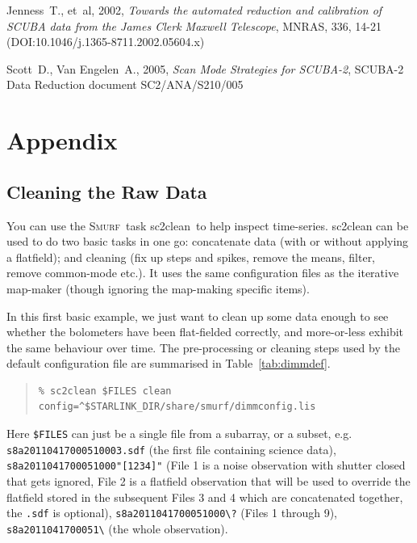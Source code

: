 \documentclass[twoside,11pt]{article}
\newcommand{\htmladdnormallink}[2]{#1}
\newcommand{\htmlref}[2]{#1}
\newcommand{\latexhtml}[2]{#1}
\newcommand{\xref}[3]{#1}
\newcommand{\xlabel}[1]{}
\renewcommand{\_}{\texttt{\symbol{95}}}
\newenvironment{myquote}{\begin{quote}\begin{small}}{\end{small}\end{quote}}
\newcommand{\smurf}{\xref{\textsc{Smurf}}{sun258}{}}
\newcommand{\task}[1]{\textsf{#1}}
\newcommand{\clean}{\xref{\task{sc2clean}}{sun258}{SC2CLEAN}}
\newcommand{\cref}[3]{\latexhtml{#1~\ref{#2}}{\htmlref{#3}{#2}}}
\begin{document}
\begin{thebibliography}{}
Jenness~T., et~al, 2002, \htmladdnormallink{\textit{Towards the automated
reduction and calibration of SCUBA data from the James Clerk Maxwell
Telescope}}{http://dx.doi.org/10.1046/j.1365-8711.2002.05604.x},
MNRAS, 336, 14-21 (DOI:10.1046/j.1365-8711.2002.05604.x)

Scott~D., Van Engelen~A., 2005, \htmladdnormallink{\textit{Scan Mode Strategies for
SCUBA-2}}{http://docs.jach.hawaii.edu/JCMT/SC2/ANA/S210/005/sc2_ana_s210_005.ps},
SCUBA-2 Data Reduction document SC2/ANA/S210/005

\end{thebibliography}

\newpage
\appendix
\section[Appendices]{Appendix}
\subsection{\xlabel{app_clean}Cleaning the Raw Data}
\label{app:clean}

You can use the \smurf\ task \clean\ to help inspect time-series.
\task{sc2clean} can be used to do two basic tasks in one go: concatenate data
(with or without applying a flatfield); and cleaning (fix up steps and
spikes, remove the means, filter, remove common-mode etc.). It uses
the same configuration files as the iterative map-maker (though
ignoring the map-making specific items).

In this first basic example, we just want to clean up some data enough
to see whether the bolometers have been flat-fielded correctly, and
more-or-less exhibit the same behaviour over time. The pre-processing
or cleaning steps used by the default configuration file are
summarised in \cref{Table}{tab:dimmdef}{this table}.

\begin{myquote}
\begin{verbatim}
% sc2clean $FILES clean config=^$STARLINK_DIR/share/smurf/dimmconfig.lis
\end{verbatim}
\end{myquote}

Here \texttt{\$FILES} can just be a single file from a subarray, or a
subset, e.g. \texttt{s8a20110417\_00051\_0003.sdf} (the first file
containing science data), \texttt{s8a20110417\_00051\_000"[1234]"}
(File 1 is a noise observation with shutter closed that gets ignored,
File 2 is a flatfield observation that will be used to override the
flatfield stored in the subsequent Files 3 and 4 which are
concatenated together, the \texttt{.sdf} is optional),
\texttt{s8a20110417\_00051\_000\textbackslash?} (Files 1 through 9),
\texttt{s8a20110417\_00051\_\textbackslash*} (the whole observation).
\end{document}

